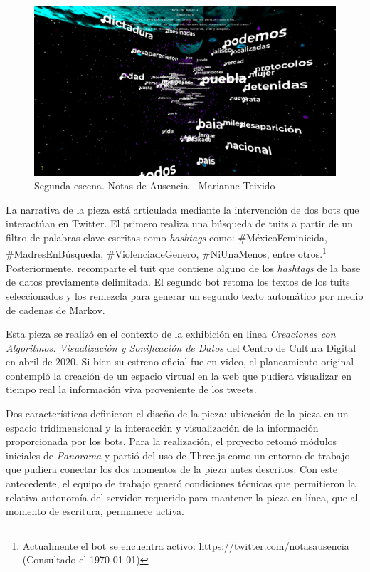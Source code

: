 \begin{figure}
  \includegraphics[width=\textwidth]{img/figura2.png}
  \caption{Segunda escena. Notas de Ausencia - Marianne Teixido}
\label{fig:notas2}
\end{figure}


La narrativa de la pieza está articulada mediante la intervención de dos bots que interactúan en Twitter. El primero realiza una búsqueda de tuits a partir de un filtro de palabras clave escritas como \emph{hashtags} como: \#MéxicoFeminicida, \#MadresEnBúsqueda, \#ViolenciadeGenero, \#NiUnaMenos, entre otros.\footnote{Actualmente el bot se encuentra activo: \url{https://twitter.com/notasausencia} (Consultado el \today)} Posteriormente, recomparte el tuit que contiene alguno de los \textit{hashtags} de la base de datos previamente delimitada. El segundo bot retoma los textos de los tuits seleccionados y los remezcla para generar un segundo texto automático por medio de cadenas de Markov. 

Esta pieza se realizó en el contexto de la exhibición en línea \textit{Creaciones con Algoritmos: Visualización y Sonificación de Datos} del Centro de Cultura Digital en abril de 2020. Si bien su estreno oficial fue en video, el planeamiento original contempló la creación de un espacio virtual en la web que pudiera visualizar en tiempo real la información viva proveniente de los tweets.

Dos características definieron el diseño de la pieza: ubicación de la pieza en un espacio tridimensional y la interacción y visualización de la información proporcionada por los bots. Para la realización, el proyecto retomó módulos iniciales de \textit{Panorama} y partió del uso de Three.js como un entorno de trabajo que pudiera conectar los dos momentos de la pieza antes descritos. Con este antecedente, el equipo de trabajo generó condiciones técnicas que permitieron la relativa autonomía del servidor requerido para mantener la pieza en línea, que al momento de escritura, permanece activa.

